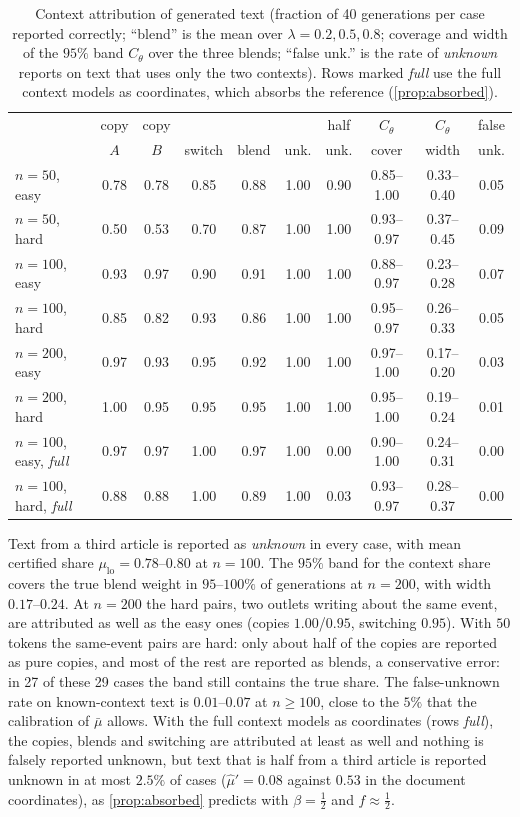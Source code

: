 \documentclass[11pt]{article}
\theoremstyle{definition}
\theoremstyle{remark}
\begin{document}
\begin{table}[ht]
\centering\footnotesize\setlength{\tabcolsep}{3.5pt}
\begin{tabular}{@{}lccccccccc@{}}
\toprule
& copy & copy & & & & half & $C_\theta$ & $C_\theta$ & false\\
& $A$ & $B$ & switch & blend & unk. & unk. & cover & width & unk.\\
\midrule
$n=50$, easy & 0.78 & 0.78 & 0.85 & 0.88 & 1.00 & 0.90 & 0.85--1.00 & 0.33--0.40 & 0.05\\
$n=50$, hard & 0.50 & 0.53 & 0.70 & 0.87 & 1.00 & 1.00 & 0.93--0.97 & 0.37--0.45 & 0.09\\
$n=100$, easy & 0.93 & 0.97 & 0.90 & 0.91 & 1.00 & 1.00 & 0.88--0.97 & 0.23--0.28 & 0.07\\
$n=100$, hard & 0.85 & 0.82 & 0.93 & 0.86 & 1.00 & 1.00 & 0.95--0.97 & 0.26--0.33 & 0.05\\
$n=200$, easy & 0.97 & 0.93 & 0.95 & 0.92 & 1.00 & 1.00 & 0.97--1.00 & 0.17--0.20 & 0.03\\
$n=200$, hard & 1.00 & 0.95 & 0.95 & 0.95 & 1.00 & 1.00 & 0.95--1.00 & 0.19--0.24 & 0.01\\
\midrule
$n=100$, easy, \emph{full} & 0.97 & 0.97 & 1.00 & 0.97 & 1.00 & 0.00 & 0.90--1.00 & 0.24--0.31 & 0.00\\
$n=100$, hard, \emph{full} & 0.88 & 0.88 & 1.00 & 0.89 & 1.00 & 0.03 & 0.93--0.97 & 0.28--0.37 & 0.00\\
\bottomrule
\end{tabular}
\caption{Context attribution of generated text (fraction of 40 generations per case reported
correctly; ``blend'' is the mean over $\lambda=0.2,0.5,0.8$; coverage and width of the $95\%$ band
$C_\theta$ over the three blends; ``false unk.'' is the rate of \emph{unknown} reports on text that
uses only the two contexts). Rows marked \emph{full} use the full context models as coordinates,
which absorbs the reference (\cref{prop:absorbed}).}\label{tab:seqattr}
\end{table}

Text from a third article is reported as \emph{unknown} in every case, with mean certified share $\mu_{\mathrm{lo}}=0.78$--$0.80$ at $n=100$. The $95\%$ band for the context share covers the true blend weight in $95$--$100\%$ of generations at $n=200$, with width $0.17$--$0.24$. At $n=200$ the hard pairs, two outlets writing about the same event, are attributed as well as the easy ones (copies $1.00$/$0.95$, switching $0.95$). With $50$ tokens the same-event pairs are hard: only about half of the copies are reported as pure copies, and most of the rest are reported as blends, a conservative error: in 27 of these 29 cases the band still contains the true share. The false-unknown rate on known-context text is $0.01$--$0.07$ at $n\ge100$, close to the $5\%$ that the calibration of $\bar\mu$ allows. With the full context models as coordinates (rows \emph{full}), the copies, blends and switching are attributed at least as well and nothing is falsely reported unknown, but text that is half from a third article is reported unknown in at most $2.5\%$ of cases ($\hat\mu'=0.08$ against $0.53$ in the document coordinates), as \cref{prop:absorbed} predicts with $\beta=\tfrac12$ and $f\approx\tfrac12$.
\end{document}
